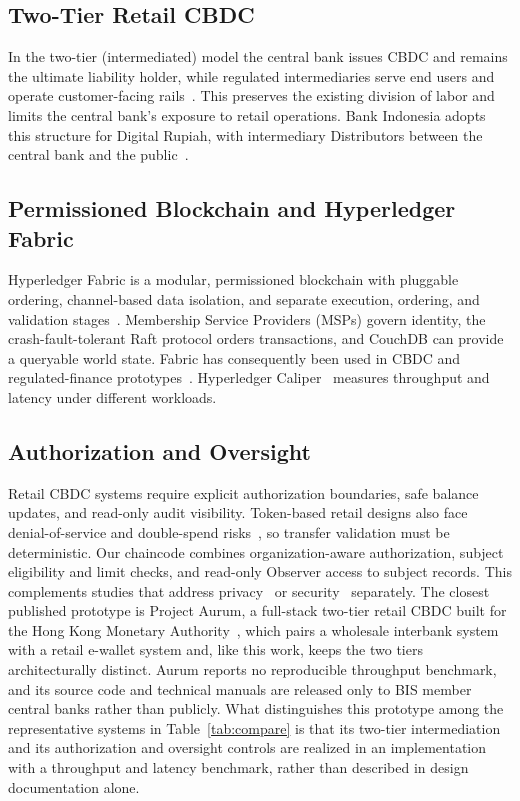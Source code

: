 \documentclass[conference]{IEEEtran}
\begin{document}
\subsection{Two-Tier Retail CBDC}
In the two-tier (intermediated) model the central bank issues CBDC and remains
the ultimate liability holder, while regulated intermediaries serve end users and
operate customer-facing rails~\cite{Auer2020The,Kiff2020A}.
This preserves the existing division of labor and limits the central bank's
exposure to retail operations. Bank Indonesia adopts this structure for Digital
Rupiah, with intermediary Distributors between
the central bank and the public~\cite{bi_whitepaper2022}.

\subsection{Permissioned Blockchain and Hyperledger Fabric}
Hyperledger Fabric is a modular, permissioned blockchain with pluggable
ordering, channel-based data isolation, and separate execution, ordering, and
validation stages~\cite{androulaki2018}. Membership Service Providers (MSPs)
govern identity, the crash-fault-tolerant Raft protocol orders transactions,
and CouchDB can provide a queryable world state. Fabric has consequently been
used in CBDC and regulated-finance
prototypes~\cite{bhawana2021,hanif2024meetcoin}. Hyperledger
Caliper~\cite{hlf_caliper,hlf_metrics} measures throughput and latency under
different workloads.

\subsection{Authorization and Oversight}
Retail CBDC systems require explicit authorization boundaries, safe balance
updates, and read-only audit visibility. Token-based retail designs also face
denial-of-service and double-spend risks~\cite{ahuja2024limbocoin}, so transfer
validation must be deterministic. Our chaincode combines organization-aware
authorization, subject eligibility and limit checks, and read-only Observer
access to subject records. This complements studies that address privacy~\cite{islam2023}
or security~\cite{hans2023} separately. The closest published prototype is Project Aurum,
a full-stack two-tier retail CBDC built for the Hong Kong Monetary
Authority~\cite{bis2022aurum}, which pairs a wholesale interbank system with a
retail e-wallet system and, like this work, keeps the two tiers
architecturally distinct. Aurum reports no reproducible throughput benchmark,
and its source code and technical manuals are released only to BIS member
central banks rather than publicly. What distinguishes this prototype among the
representative systems in Table~\ref{tab:compare} is that its two-tier
intermediation and its authorization and oversight controls are realized in an
implementation with a throughput and latency benchmark, rather than
described in design documentation alone.
\end{document}
